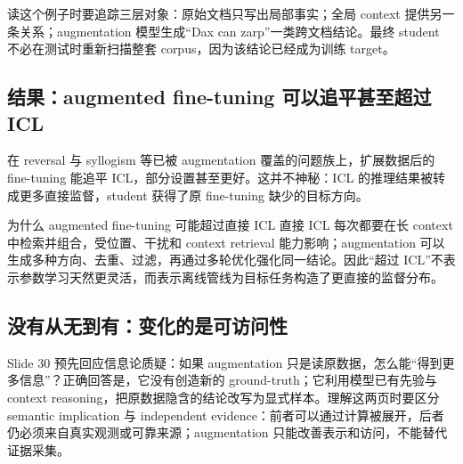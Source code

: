 
读这个例子时要追踪三层对象：原始文档只写出局部事实；全局 context 提供另一条关系；augmentation 模型生成“Dax can zarp”一类跨文档结论。最终 student 不必在测试时重新扫描整套 corpus，因为该结论已经成为训练 target。

\subsection{结果：augmented fine-tuning 可以追平甚至超过 ICL}

在 reversal 与 syllogism 等已被 augmentation 覆盖的问题族上，扩展数据后的 fine-tuning 能追平 ICL，部分设置甚至更好。这并不神秘：ICL 的推理结果被转成更多直接监督，student 获得了原 fine-tuning 缺少的目标方向。




\begin{knowledgebox}{为什么 augmented fine-tuning 可能超过直接 ICL}
直接 ICL 每次都要在长 context 中检索并组合，受位置、干扰和 context retrieval 能力影响；augmentation 可以生成多种方向、去重、过滤，再通过多轮优化强化同一结论。因此“超过 ICL”不表示参数学习天然更灵活，而表示离线管线为目标任务构造了更直接的监督分布。
\end{knowledgebox}

\subsection{没有从无到有：变化的是可访问性}

Slide 30 预先回应信息论质疑：如果 augmentation 只是读原数据，怎么能“得到更多信息”？正确回答是，它没有创造新的 ground-truth；它利用模型已有先验与 context reasoning，把原数据隐含的结论改写为显式样本。理解这两页时要区分 semantic implication 与 independent evidence：前者可以通过计算被展开，后者仍必须来自真实观测或可靠来源；augmentation 只能改善表示和访问，不能替代证据采集。

